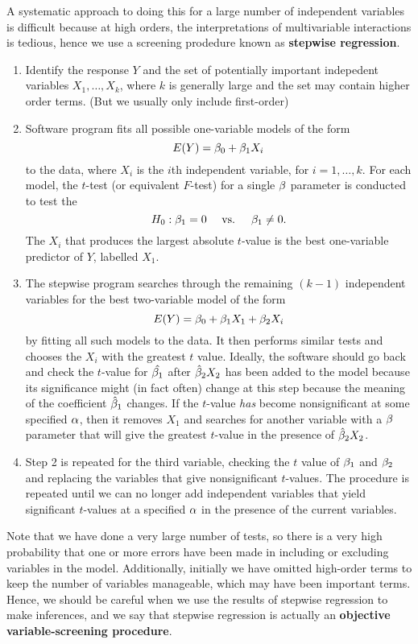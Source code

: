 \documentclass{report}
\newcommand{\gbh}{\hat{\gb}}
\begin{document}
	A systematic approach to doing this for a large number of independent variables is difficult because at high orders, the interpretations of multivariable interactions is tedious, hence we use a screening prodedure known as \textbf{stepwise regression}.\\
	
	\begin{enumerate}
		\item Identify the response $Y$ and the set of potentially important indepedent variables $X_1,\ldots,X_k$, where $k$ is generally large and the set may contain higher order terms. (But we usually only include first-order)
		\item Software program fits all possible one-variable models of the form
		$$E(Y)=\beta_0+\beta_1X_i$$
		to the data, where $X_i$ is the $i$th independent variable, for $i=1,\ldots,k$. For each model, the $t$-test (or equivalent $F$-test) for a single $\beta$ parameter is conducted to test the $$H_0: \beta_1=0 \quad \text{ vs. }\quad\beta_1\neq 0.$$
		The $X_i$ that produces the largest absolute $t$-value is the best one-variable predictor of $Y$, labelled $X_1$.
		\item The stepwise program searches through the remaining $(k-1)$ independent variables for the best two-variable model of the form
		$$E(Y)=\beta_0+\beta_1X_1+\beta_2X_i$$
		by fitting all such models to the data. It then performs similar tests and chooses the $X_i$ with the greatest $t$ value. Ideally, the software should go back and check the $t$-value for $\hat{\beta_1}$ after $\gbh_2X_2$ has been added to the model because its significance might (in fact often) change at this step because the meaning of the coefficient $\gbh_1$ changes. If the $t$-value \textit{has} become nonsignificant at some specified $\alpha$, then it removes $X_1$ and searches for another variable with a $\beta$ parameter that will give the greatest $t$-value in the presence of $\gbh_2X_2$. 
		\item Step 2 is repeated for the third variable, checking the $t$ value of $\beta_1$ and $\beta_2$ and replacing the variables that give nonsignificant $t$-values. The procedure is repeated until we can no longer add independent variables that yield significant $t$-values at a specified $\alpha$ in the presence of the current variables. 
	\end{enumerate}
	
	Note that we have done a very large number of tests, so there is a very high probability that one or more errors have been made in including or excluding variables in the model. Additionally, initially we have omitted high-order terms to keep the number of variables manageable, which may have been important terms. Hence, we should be careful when we use the results of stepwise regression to make inferences, and we say that stepwise regression is actually an \textbf{objective variable-screening procedure}.\\
	
\end{document}
